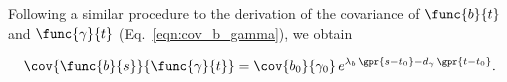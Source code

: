 Following a similar procedure to the derivation of the covariance of $\func{b}{t}$ and $\func{\gamma}{t}$ (Eq.~\ref{eqn:cov_b_gamma}), we obtain

\begin{equation}
	\cov{\func{b}{s}}{\func{\gamma}{t}} = \cov{b_0}{\gamma_0}\,e^{\lambda_b\,\gpr{s - t_0} - d_{\gamma}\,\gpr{t - t_0}}. \label{eqn:cov_bs_gammat}
\end{equation}